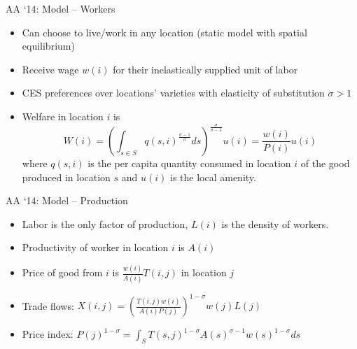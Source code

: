 \documentclass[11pt,notes=hide,aspectratio=169]{beamer}
\begin{document}
\begin{frame}{AA `14: Model -- Workers}
\begin{itemize}
\item Can choose to live/work in any location (static model with spatial equilibrium)
\item Receive wage $w\left(i\right)$ for their inelastically supplied unit of labor
\item CES preferences over locations' varieties with elasticity of substitution $\sigma>1$
\item Welfare in location $i$ is
\begin{equation*}
W\left(i\right)
=
\left(\int_{s\in S}q\left(s,i\right)^{\frac{\sigma-1}{\sigma}}ds\right)^{\frac{\sigma}{\sigma-1}}u\left(i\right)
=
\frac{w(i)}{P(i)}u(i)
\end{equation*}
 where $q\left(s,i\right)$ is the per capita quantity consumed in location $i$ of the good produced in location $s$ and $u\left(i\right)$ is the local amenity.
\end{itemize}
\end{frame}
\begin{frame}{AA `14: Model -- Production}
\begin{itemize}
\item Labor is the only factor of production, $L(i)$  is the density of workers.
\item Productivity of worker in location $i$ is $A(i)$
\item Price of good from $i$ is $\frac{w\left(i\right)}{A\left(i\right)}T\left(i,j\right)$  in location $j$
\item Trade flows: $X(i,j) = \left (\frac{T(i,j)w(i)}{A(i)P(j)}\right)^{1-\sigma} w(j)L(j)$
\item Price index: $P(j)^{1-\sigma} = \int_{S}  T(s,j)^{1-\sigma} A(s)^{\sigma-1} w(s)^{1-\sigma} ds$
\end{itemize}
\end{frame}
\end{document}

